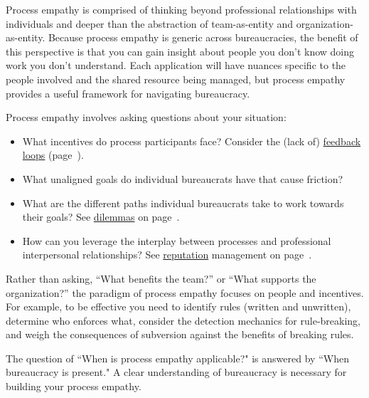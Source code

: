 Process empathy is comprised of thinking beyond professional relationships with individuals and deeper than the abstraction of team-as-entity and organization-as-entity. 
Because process empathy is generic across bureaucracies, the benefit of this perspective is that you can gain insight about people you don't know doing work you don't understand.
Each application will have nuances specific to the people involved and the shared resource being managed, but process empathy provides a useful framework for navigating bureaucracy.


Process empathy involves asking questions about your situation:
\begin{itemize}
    \item What incentives do process participants face?
Consider the (lack of) \hyperref[sec:feedback-loop-and-ripples]{feedback loops} (page~\pageref{sec:feedback-loop-and-ripples}).
    \item What unaligned goals do individual bureaucrats have that cause friction?
    \item What are the different paths individual bureaucrats take to work towards their goals?
See \hyperref[sec:dilemma-trilemma]{dilemmas} on page~\pageref{sec:dilemma-trilemma}.
    \item How can you leverage the interplay between processes and  professional interpersonal relationships?
See \hyperref[sec:reputation]{reputation} management on page~\pageref{sec:reputation}.
\end{itemize}

Rather than asking, ``What benefits the team?'' or ``What supports the organization?'' the paradigm of process empathy focuses on people and incentives. %
For example, to be effective you need to 
identify rules (written and unwritten), determine who enforces what, consider the detection mechanics for rule-breaking, and weigh the consequences of subversion against the benefits of breaking rules.


The question of ``When is process empathy applicable?" is answered by ``When bureaucracy is present." A clear understanding of bureaucracy is necessary for building your process empathy.
